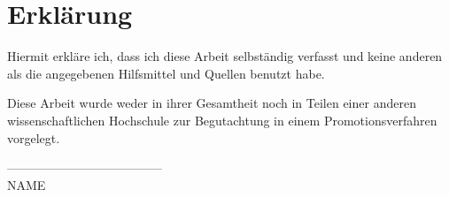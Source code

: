 \chapter*{Erklärung}
Hiermit erkläre ich, dass ich diese Arbeit selbständig verfasst und keine anderen als die angegebenen Hilfsmittel und Quellen benutzt habe.

\vspace*{1cm}
\noindent Diese Arbeit wurde weder in ihrer Gesamtheit noch in Teilen einer anderen wissenschaftlichen Hochschule zur Begutachtung in einem Promotionsverfahren vorgelegt.

\vspace*{1cm}
\begin{flushright}
--------------------------------------\\
NAME
\end{flushright}

\hfill